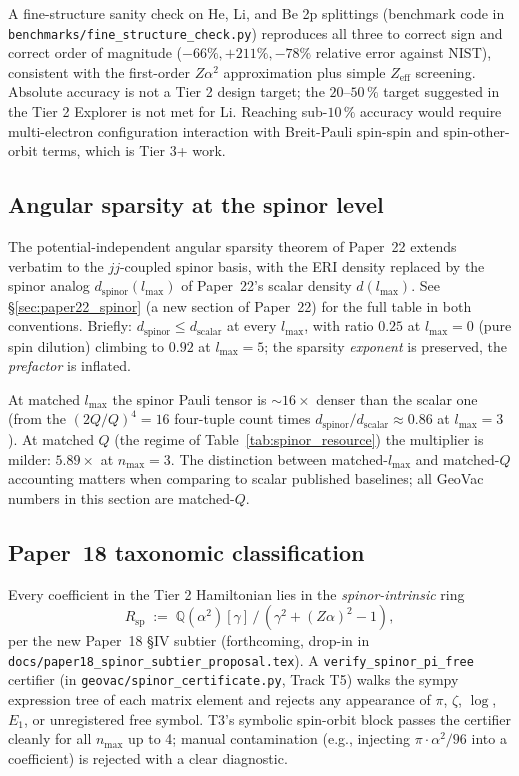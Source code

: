 A fine-structure sanity check on He, Li, and Be 2p splittings
(benchmark code in
\texttt{benchmarks/fine\_structure\_check.py}) reproduces
all three to correct sign and correct order of magnitude
($-66\%, +211\%, -78\%$ relative error against NIST), consistent
with the first-order $Z\alpha^2$ approximation plus simple
$Z_{\mathrm{eff}}$ screening. Absolute accuracy is not a Tier 2
design target; the $20$--$50\,\%$ target suggested in the Tier 2
Explorer is not met for Li. Reaching sub-$10\,\%$ accuracy would
require multi-electron configuration interaction with Breit-Pauli
spin-spin and spin-other-orbit terms, which is Tier 3+ work.

\subsection{Angular sparsity at the spinor level}
\label{subsec:spinor_sparsity_crossref}

The potential-independent angular sparsity theorem of Paper~22 extends
verbatim to the $jj$-coupled spinor basis, with the ERI density
replaced by the spinor analog $d_{\mathrm{spinor}}(l_{\max})$ of
Paper~22's scalar density $d(l_{\max})$. See \S\ref{sec:paper22_spinor}
(a new section of Paper~22) for the full table in both conventions.
Briefly: $d_{\mathrm{spinor}} \leq d_{\mathrm{scalar}}$ at every
$l_{\max}$, with ratio $0.25$ at $l_{\max}=0$ (pure spin dilution)
climbing to $0.92$ at $l_{\max}=5$; the sparsity \emph{exponent}
is preserved, the \emph{prefactor} is inflated.

At matched $l_{\max}$ the spinor Pauli tensor is $\sim 16\times$
denser than the scalar one (from the $(2Q/Q)^4 = 16$ four-tuple
count times $d_{\mathrm{spinor}}/d_{\mathrm{scalar}} \approx 0.86$
at $l_{\max}=3$). At matched $Q$ (the regime of
Table~\ref{tab:spinor_resource}) the multiplier is milder:
$5.89\times$ at $n_{\max}=3$. The distinction between matched-$l_{\max}$
and matched-$Q$ accounting matters when comparing to scalar published
baselines; all GeoVac numbers in this section are matched-$Q$.

\subsection{Paper~18 taxonomic classification}
\label{subsec:spinor_paper18}

Every coefficient in the Tier 2 Hamiltonian lies in the
\emph{spinor-intrinsic} ring
\[
  R_{\mathrm{sp}} \;:=\; \mathbb{Q}(\alpha^2)[\gamma] \,/\, (\gamma^2 + (Z\alpha)^2 - 1),
\]
per the new Paper~18 \S IV subtier (forthcoming, drop-in in
\texttt{docs/paper18\_spinor\_subtier\_proposal.tex}). A
\texttt{verify\_spinor\_pi\_free} certifier (in
\texttt{geovac/spinor\_certificate.py}, Track T5) walks the sympy
expression tree of each matrix element and rejects any appearance of
$\pi$, $\zeta$, $\log$, $E_1$, or unregistered free symbol. T3's
symbolic spin-orbit block passes the certifier cleanly for all
$n_{\max}$ up to 4; manual contamination (e.g., injecting
$\pi \cdot \alpha^2 / 96$ into a coefficient) is rejected with a
clear diagnostic.

